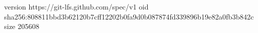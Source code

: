 version https://git-lfs.github.com/spec/v1
oid sha256:808811bbd3b62120b7cff12202b0fa9d0b087874fd339896b19e82a0fb3b842c
size 205608
